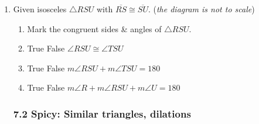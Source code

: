 \documentclass[12pt, twoside]{article}
\begin{document}
\begin{enumerate}
\item Given isosceles $\triangle RSU$ with $\overline{RS} \cong \overline{SU}$. \hfill (\emph{the diagram is not to scale})
      \begin{enumerate}
      \item Mark the congruent sides \& angles of $\triangle RSU$. %
        \item True \quad False \quad $\angle RSU \cong \angle TSU$
        \item True \quad False \quad $m\angle RSU + m\angle TSU =180$  
        \item True \quad False \quad $m\angle R + m\angle RSU + m\angle U =180$   
    \end{enumerate}

\newpage
\subsubsection*{7.2 Spicy: Similar triangles, dilations}


\end{enumerate}
\end{document}
